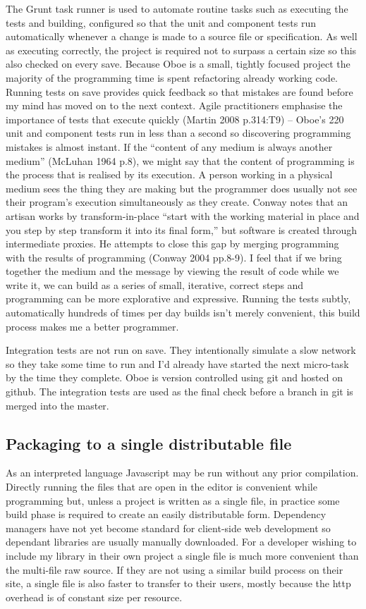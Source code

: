 \documentclass[]{article}
\begin{document}
The Grunt task runner is used to automate routine tasks such as
executing the tests and building, configured so that the unit and
component tests run automatically whenever a change is made to a source
file or specification. As well as executing correctly, the project is
required not to surpass a certain size so this also checked on every
save. Because Oboe is a small, tightly focused project the majority of
the programming time is spent refactoring already working code. Running
tests on save provides quick feedback so that mistakes are found before
my mind has moved on to the next context. Agile practitioners emphasise
the importance of tests that execute quickly (Martin 2008 p.314:T9) --
Oboe's 220 unit and component tests run in less than a second so
discovering programming mistakes is almost instant. If the ``content of
any medium is always another medium'' (McLuhan 1964 p.8), we might say
that the content of programming is the process that is realised by its
execution. A person working in a physical medium sees the thing they are
making but the programmer does usually not see their program's execution
simultaneously as they create. Conway notes that an artisan works by
transform-in-place ``start with the working material in place and you
step by step transform it into its final form,'' but software is created
through intermediate proxies. He attempts to close this gap by merging
programming with the results of programming (Conway 2004 pp.8-9). I feel
that if we bring together the medium and the message by viewing the
result of code while we write it, we can build as a series of small,
iterative, correct steps and programming can be more explorative and
expressive. Running the tests subtly, automatically hundreds of times
per day builds isn't merely convenient, this build process makes me a
better programmer.

Integration tests are not run on save. They intentionally simulate a
slow network so they take some time to run and I'd already have started
the next micro-task by the time they complete. Oboe is version
controlled using git and hosted on github. The integration tests are
used as the final check before a branch in git is merged into the
master.

\subsection{Packaging to a single distributable file}

As an interpreted language Javascript may be run without any prior
compilation. Directly running the files that are open in the editor is
convenient while programming but, unless a project is written as a
single file, in practice some build phase is required to create an
easily distributable form. Dependency managers have not yet become
standard for client-side web development so dependant libraries are
usually manually downloaded. For a developer wishing to include my
library in their own project a single file is much more convenient than
the multi-file raw source. If they are not using a similar build process
on their site, a single file is also faster to transfer to their users,
mostly because the http overhead is of constant size per resource.
\end{document}
